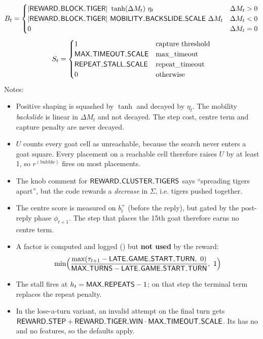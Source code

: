 \[
B_t = \begin{cases} \lvert\knob{REWARD\_BLOCK\_TIGER}\rvert\ \tanh(\Delta M_t)\ \eta_t & \Delta M_t > 0 \\ \lvert\knob{REWARD\_BLOCK\_TIGER}\rvert\ \knob{MOBILITY\_BACKSLIDE\_SCALE}\ \Delta M_t & \Delta M_t < 0 \\ 0 & \Delta M_t = 0 \end{cases}
\]
\[
S_t = \begin{cases} 1 & \text{capture threshold} \\ \knob{MAX\_TIMEOUT\_SCALE} & \text{max\_timeout} \\ \knob{REPEAT\_STALL\_SCALE} & \text{repeat\_timeout} \\ 0 & \text{otherwise} \end{cases}
\]
Notes:

\begin{itemize}
\item Positive shaping is squashed by $\tanh$ and decayed by $\eta_t$. The mobility \emph{backslide} is linear in $\Delta M_t$ and not decayed. The step cost, centre term and capture penalty are never decayed.
\item $U$ counts every goat cell as unreachable, because the search never enters a goat square. Every placement on a reachable cell therefore raises $U$ by at least 1, so $r^{(\text{bubble})}$ fires on most placements.
\item The knob comment for $\knob{REWARD\_CLUSTER\_TIGERS}$ says ``spreading tigers apart'', but the code rewards a \emph{decrease} in $\Sigma$, i.e. tigers pushed together.
\item The centre score is measured on $b^+_t$ (before the reply), but gated by the post-reply phase $\phi_{t+1}$. The step that places the 15th goat therefore earns no centre term.
\item A  factor is computed and logged () but \textbf{not used} by the reward:
\[
\min\!\Big(\frac{\max(\tau_{t+1} - \knob{LATE\_GAME\_START\_TURN},\ 0)}{\knob{MAX\_TURNS} - \knob{LATE\_GAME\_START\_TURN}},\ 1\Big)
\]
\item The stall fires at $h_t = \knob{MAX\_REPEATS} - 1$; on that step the terminal term replaces the repeat penalty.
\item In the lose-a-turn variant, an invalid attempt on the final turn gets $\knob{REWARD\_STEP} + \knob{REWARD\_TIGER\_WIN}\cdot\knob{MAX\_TIMEOUT\_SCALE}$. Its  has no  and no features, so the defaults apply.
\end{itemize}
